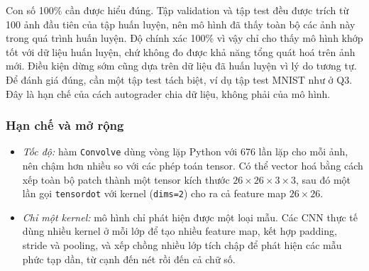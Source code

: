 Con số 100\% cần được hiểu đúng. Tập validation và tập test đều được trích
từ 100 ảnh đầu tiên của tập huấn luyện, nên mô hình đã thấy toàn bộ các ảnh
này trong quá trình huấn luyện. Độ chính xác 100\% vì vậy chỉ cho thấy mô
hình khớp tốt với dữ liệu huấn luyện, chứ không đo được khả năng tổng quát
hoá trên ảnh mới. Điều kiện dừng sớm cũng dựa trên dữ liệu đã huấn luyện vì
lý do tương tự. Để đánh giá đúng, cần một tập test tách biệt, ví dụ tập test
MNIST như ở Q3. Đây là hạn chế của cách autograder chia dữ liệu, không phải
của mô hình.

\subsubsection{Hạn chế và mở rộng}
\begin{itemize}
  \item \emph{Tốc độ:} hàm \texttt{Convolve} dùng vòng lặp Python với 676 lần
  lặp cho mỗi ảnh, nên chậm hơn nhiều so với các phép toán tensor. Có thể
  vector hoá bằng cách xếp toàn bộ patch thành một tensor kích thước
  $26 \times 26 \times 3 \times 3$, sau đó một lần gọi \texttt{tensordot} với
  kernel (\texttt{dims=2}) cho ra cả feature map $26 \times 26$.
  \item \emph{Chỉ một kernel:} mô hình chỉ phát hiện được một loại mẫu. Các
  CNN thực tế dùng nhiều kernel ở mỗi lớp để tạo nhiều feature map, kết hợp
  padding, stride và pooling, và xếp chồng nhiều lớp tích chập để phát hiện
  các mẫu phức tạp dần, từ cạnh đến nét rồi đến cả chữ số.
\end{itemize}
